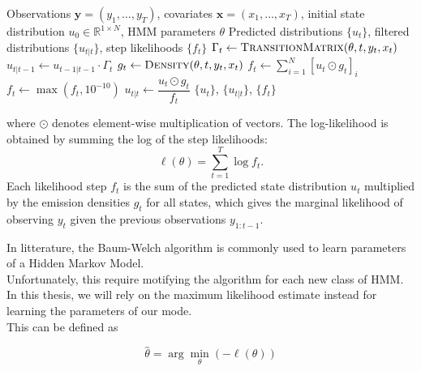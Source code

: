 \begin{algorithm}[H]
\caption{Recursive Filtering Forward Algorithm}
\label{alg:forward}
\begin{algorithmic}[1]
\Require Observations $\mathbf{y} = (y_1, \dots, y_T)$, covariates
    $\mathbf{x} = (x_1, \dots, x_T)$, initial state distribution
    $u_0 \in \mathbb{R}^{1 \times N}$, HMM parameters $\theta$
\Ensure Predicted distributions $\{u_t\}$, filtered distributions
    $\{u_{t|t}\}$, step likelihoods $\{f_t\}$
    \State $\Gamma_t \gets \textsc{TransitionMatrix}(\theta, t, y_t, x_t)$
    \State $u_{t|t-1} \gets u_{t-1|t-1} \cdot \Gamma_t$
    \State $g_t \gets \textsc{Density}(\theta, t, y_t, x_t)$
    \State $f_t \gets \sum_{i=1}^{N} \left[ u_t \odot g_t \right]_i$
    \State $f_t \gets \max(f_t, 10^{-10})$
    \State $u_{t|t} \gets \dfrac{u_t \odot g_t}{f_t}$
\EndFor
\State \Return $\{u_t\}$, $\{u_{t|t}\}$, $\{f_t\}$
\end{algorithmic}
\end{algorithm}

\noindent where $\odot$ denotes element-wise multiplication of vectors.
The log-likelihood is obtained by summing the log of the step likelihoods:
\begin{equation}
    \ell(\theta) = \sum_{t=1}^{T} \log f_t .
\end{equation}
Each likelihood step $f_t$ is the sum of the predicted state distribution $u_t$ multiplied by the emission densities $g_t$ for all states, 
which gives the marginal likelihood of observing $y_t$ given the previous observations $y_{1:t-1}$.
\bigskip

In litterature, the Baum-Welch algorithm is commonly used to learn parameters of a Hidden Markov Model.\\
Unfortunately, this require motifying the algorithm for each new class of HMM.
In this thesis, we will rely on the maximum likelihood estimate instead for learning the parameters of our mode. \\
This can be defined as

$$
\hat{\theta} = \arg\min_{\theta} \left(-\ell(\theta)\right)
$$

